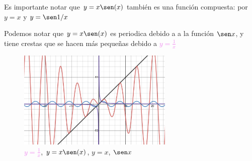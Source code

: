 \documentclass[12pt, letterpaper]{article}
\begin{document}
Es importante notar que \textcolor{red}{$y = x\sen (x)$} también es una función compuesta: por $y = x$ y $y = \sen 1/x$

Podemos notar que \textcolor{red}{$y = x\sen (x)$} es periodica debido a a la función \textcolor{blue}{$\sen x$}, y tiene crestas que se hacen más pequeñas debido a \textcolor{violet}{$y = \frac{1}{x}$}
\begin{figure}[htb]
\centering
\includegraphics[width=20em]{t9cinco}
\caption{\textcolor{violet}{$y = \frac{1}{x}$}, \textcolor{red}{$y = x\sen (x)$}, $y =x$, \textcolor{blue}{$\sen x$}}
\end{figure}
\end{document}
